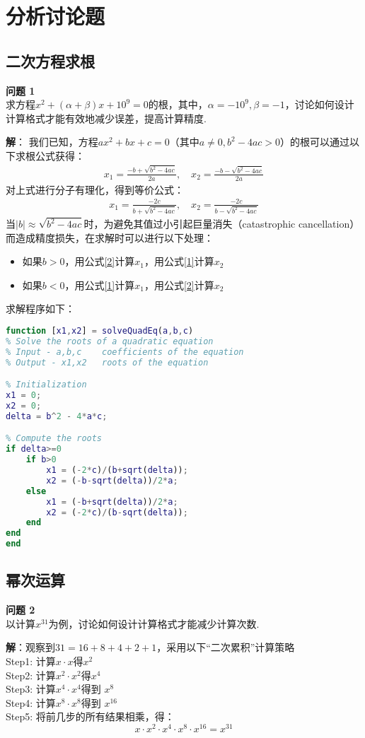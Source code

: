 \documentclass[UTF8]{ctexart}
\newenvironment{problem}[2][问题]
    {\begin{mdframed}[backgroundcolor=gray!20] \textbf{#1 #2} \\}
    {\end{mdframed}}
\begin{document}
\section{分析讨论题}

\subsection{二次方程求根}

\begin{problem}{1}
求方程$x^{2}+(\alpha+\beta) x+10^{9}=0$的根，其中，$\alpha=-10^{9}, \beta=-1$，讨论如何设计计算格式才能有效地减少误差，提高计算精度.
\end{problem}

\textbf{解}：
我们已知，方程$ax^2 + bx + c = 0$（其中$a \neq 0, b^2 - 4ac > 0$）的根可以通过以下求根公式获得：
\begin{align}
	x_{1}=\frac{-b+\sqrt{b^{2}-4 a c}}{2 a}, \quad x_{2}=\frac{-b-\sqrt{b^{2}-4 a c}}{2 a}\label{1}
\end{align}
对上式进行分子有理化，得到等价公式：
\begin{align}
	x_{1}=\frac{-2 c}{b+\sqrt{b^{2}-4 a c}}, \quad x_{2}=\frac{-2 c}{b-\sqrt{b^{2}-4 a c}}\label{2}
\end{align}
当$|b| \approx \sqrt{b^{2}-4 a c}$时，为避免其值过小引起巨量消失（catastrophic cancellation）而造成精度损失，在求解时可以进行以下处理：
\begin{itemize}
	\item 如果$b>0$，用公式\eqref{2}计算$x_1$，用公式\eqref{1}计算$x_2$
	\item 如果$b<0$，用公式\eqref{1}计算$x_1$，用公式\eqref{2}计算$x_2$
\end{itemize}
求解程序如下：
\begin{lstlisting}[language=matlab]
function [x1,x2] = solveQuadEq(a,b,c)
% Solve the roots of a quadratic equation
% Input - a,b,c    coefficients of the equation
% Output - x1,x2   roots of the equation

% Initialization
x1 = 0;
x2 = 0;
delta = b^2 - 4*a*c;

% Compute the roots
if delta>=0
	if b>0
		x1 = (-2*c)/(b+sqrt(delta));
		x2 = (-b-sqrt(delta))/2*a;
	else 
		x1 = (-b+sqrt(delta))/2*a;
		x2 = (-2*c)/(b-sqrt(delta));
	end
end
end
\end{lstlisting}

\subsection{幂次运算}

\begin{problem}{2}
	以计算$x^{31}$为例，讨论如何设计计算格式才能减少计算次数.
\end{problem}

\textbf{解}：观察到$31 = 16 + 8 + 4 + 2 + 1$，采用以下“二次累积”计算策略\\
Step1: 计算$x\cdot x$得$x^2$\\
Step2: 计算$x^2\cdot x^2$得$x^4$\\
Step3: 计算$x^4\cdot x^4$得到 $x^8$\\
Step4: 计算$x^8\cdot x^8$得到 $x^{16}$\\
Step5: 将前几步的所有结果相乘，得：
$$x\cdot x^2 \cdot x^4 \cdot x^8 \cdot x^{16} = x^{31}$$
\end{document}
